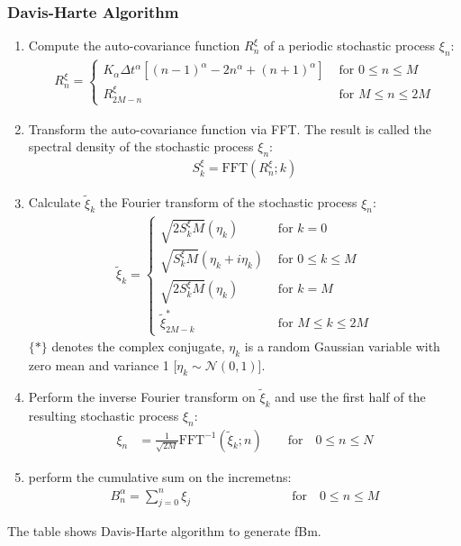 \documentclass[
  a4paper,BCOR10mm,oneside,
  headsepline,footsepline,%
  fleqn,openbib
]{scrbook}
\begin{document}
\subsubsection{Davis-Harte Algorithm}
\begin{table}[h!]
 \begin{framed}
\begin{enumerate}
 \item Compute the auto-covariance function $R^{\xi}_n$ of a periodic stochastic process $\xi_n$:
 \begin{align}
  R^{\xi}_n= 
  \begin{cases}
    K_{\alpha} \Delta t^{\alpha}\left[(n-1)^{\alpha}-2n^{\alpha}+(n+1)^{\alpha}\right] & \text{ for    } 0 \leq n \leq M \\
   R^{\xi}_{2M-n}  & \text{ for    } M \leq n \leq 2M 
  \end{cases}
 \end{align}
 \item Transform the auto-covariance function via FFT. The result is called the spectral density of the stochastic process $\xi_n$:
  \begin{align}
   S^{\xi}_k= \mathrm{FFT}(R^{\xi}_n;k)
  \end{align}
 \item Calculate $\tilde\xi_k$ the Fourier transform of the stochastic process $\xi_n$:
 \begin{align}
  \tilde\xi_k=
  \begin{cases}
     \sqrt{2 S^{\xi}_k M}(\eta_k) & \text{ for    } k=0 \\    
     \sqrt{ S^{\xi}_k M}(\eta_k+i \eta_k)  & \text{ for    } 0 \leq k \leq M \\
     \sqrt{2 S^{\xi}_k M}(\eta_k)  & \text{ for    } k = M \\
     \tilde\xi^{*}_{2M-k} & \text{ for    } M \leq k \leq 2M 
  \end{cases}
 \end{align}
 $\{*\}$ denotes the complex conjugate, $\eta_k$ is a random Gaussian variable with zero mean and variance 1 [$\eta_k\sim \mathcal{N}(0,1)$].  
 \item Perform the inverse Fourier transform on $\tilde\xi_k$ and use the first half of the resulting stochastic process $\xi_n$:
 \begin{align}
  \xi_n&=\frac{1}{\sqrt{2 M}} \mathrm{FFT}^{-1}(\tilde\xi_k;n) \qquad \text{for} \quad 0 \leq n \leq N
 \end{align}
 \item perform the cumulative sum on the incremetns:
 \begin{align}
  B^{\alpha}_n=\sum^n_{j=0} \xi_j \qquad \qquad \qquad \qquad \text{for} \quad 0 \leq n \leq M
 \end{align}
\end{enumerate}
\end{framed}
\caption{The table shows Davis-Harte algorithm \cite{DAVIES1987} to generate fBm.}
\label{Davies_harte-algorithm}
\end{table}
\end{document}

